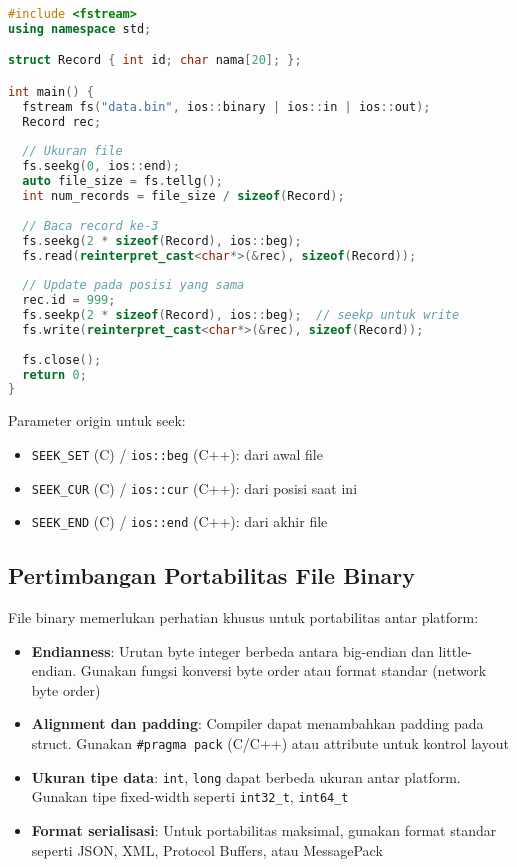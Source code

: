 \documentclass[../main.tex]{subfiles}
\begin{document}
\begin{lstlisting}[language=C++, caption={seekg/tellg untuk akses acak}]
#include <fstream>
using namespace std;

struct Record { int id; char nama[20]; };

int main() {
  fstream fs("data.bin", ios::binary | ios::in | ios::out);
  Record rec;
  
  // Ukuran file
  fs.seekg(0, ios::end);
  auto file_size = fs.tellg();
  int num_records = file_size / sizeof(Record);
  
  // Baca record ke-3
  fs.seekg(2 * sizeof(Record), ios::beg);
  fs.read(reinterpret_cast<char*>(&rec), sizeof(Record));
  
  // Update pada posisi yang sama
  rec.id = 999;
  fs.seekp(2 * sizeof(Record), ios::beg);  // seekp untuk write
  fs.write(reinterpret_cast<char*>(&rec), sizeof(Record));
  
  fs.close();
  return 0;
}
\end{lstlisting}

Parameter origin untuk seek:
\begin{itemize}
  \item \texttt{SEEK\_SET} (C) / \texttt{ios::beg} (C++): dari awal file
  \item \texttt{SEEK\_CUR} (C) / \texttt{ios::cur} (C++): dari posisi saat ini
  \item \texttt{SEEK\_END} (C) / \texttt{ios::end} (C++): dari akhir file
\end{itemize}

\subsection{Pertimbangan Portabilitas File Binary}

File binary memerlukan perhatian khusus untuk portabilitas antar platform:

\begin{itemize}
  \item \textbf{Endianness}: Urutan byte integer berbeda antara big-endian dan little-endian. Gunakan fungsi konversi byte order atau format standar (network byte order)
  \item \textbf{Alignment dan padding}: Compiler dapat menambahkan padding pada struct. Gunakan \texttt{\#pragma pack} (C/C++) atau attribute untuk kontrol layout
  \item \textbf{Ukuran tipe data}: \texttt{int}, \texttt{long} dapat berbeda ukuran antar platform. Gunakan tipe fixed-width seperti \texttt{int32\_t}, \texttt{int64\_t}
  \item \textbf{Format serialisasi}: Untuk portabilitas maksimal, gunakan format standar seperti JSON, XML, Protocol Buffers, atau MessagePack
\end{itemize}
\end{document}
